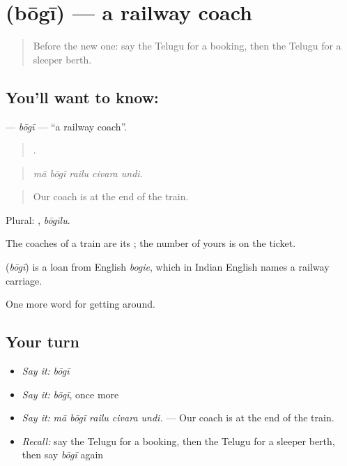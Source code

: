 \section[\texorpdfstring{\te{బోగీ} (bōgī)}{బోగీ (bōgī)}]{ (bōgī) — a railway coach}

\label{lesson:TE-C439-bogi}



\begin{quote}
Before the new one: say the Telugu for a booking, then the Telugu for a sleeper berth.
\end{quote}

\subsection*{You'll want to know: }
\textbf{} — \emph{bōgī} — \textquotedblleft{}a railway coach\textquotedblright{}.

\begin{quote}
    .
\end{quote}

\begin{quote}
\emph{mā bōgī railu civara undi.}
\end{quote}

\begin{quote}
Our coach is at the end of the train.
\end{quote}

Plural: , \emph{bōgīlu}.

The coaches of a train are its ; the number of yours is on the ticket.

\begin{cousinweb}
\textbf{} (\emph{bōgī}) is a loan from English \emph{bogie}, which in Indian English names a railway carriage.
\end{cousinweb}

\begin{grammarlens}[title={What you've built}]
One more word for getting around.
\end{grammarlens}

\subsection*{Your turn}
\begin{itemize}
\raggedright
  \item \emph{Say it:} \emph{bōgī}
  \item \emph{Say it:} \emph{bōgī}, once more
  \item \emph{Say it:} \emph{mā bōgī railu civara undi.} — Our coach is at the end of the train.
  \item \emph{Recall:} say the Telugu for a booking, then the Telugu for a sleeper berth, then say \emph{bōgī} again
\end{itemize}

